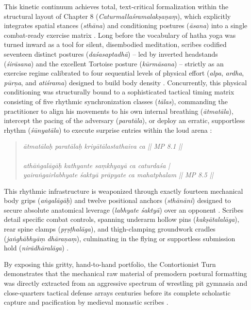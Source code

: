 \documentclass[11pt,twoside,letterpaper]{article}
\begin{document}
This kinetic continuum achieves total, text-critical formalization within the structural layout of Chapter 8 (\textit{Caturmallaśramalakṣaṇaṃ}), which explicitly integrates spatial stances (\textit{sthāna}) and conditioning postures (\textit{āsana}) into a single combat-ready exercise matrix \citep{MP_7}. Long before the vocabulary of hatha yoga was turned inward as a tool for silent, disembodied meditation, scribes codified seventeen distinct postures (\textit{daśasaptadhā}) -- led by inverted headstands (\textit{śirāsana}) and the excellent Tortoise posture (\textit{kūrmāsana}) -- strictly as an exercise regime calibrated to four sequential levels of physical effort (\textit{alpa}, \textit{ardha}, \textit{pūrṇa}, and \textit{atiśrama}) designed to build body density \citep{MP_7}. Concurrently, this physical conditioning was structurally bound to a sophisticated tactical timing matrix consisting of five rhythmic synchronization classes (\textit{tālas}), commanding the practitioner to align his movements to his own internal breathing (\textit{ātmatāla}), intercept the pacing of the adversary (\textit{paratāla}), or deploy an erratic, supportless rhythm (\textit{śūnyatāla}) to execute surprise entries within the loud arena \citep{MP_7}:

\begin{quote}
\small
\textit{ātmatālaḥ paratālaḥ kriyātālastathaiva ca || MP 8.1 || \\
\\
athāṅgalāgāḥ kathyante saṃkhyayā ca caturdaśa | \\
yairaṅgairlabhyate śaktyā prāpyate ca mahatphalam || MP 8.5 ||}
\end{quote}

This rhythmic infrastructure is weaponized through exactly fourteen mechanical body grips (\textit{aṅgalāgāḥ}) and twelve positional anchors (\textit{sthānāni}) designed to secure absolute anatomical leverage (\textit{labhyate śaktyā}) over an opponent \citep{MP_7}. Scribes detail specific combat controls, spanning underarm hollow pins (\textit{kakṣātalalāga}), rear spine clamps (\textit{pṛṣṭhalāga}), and thigh-clamping groundwork cradles (\textit{jaṅghābhyāṃ dhāraṇaṃ}), culminating in the flying or supportless submission hold (\textit{nirādhāralāga}) \citep{MP_7}. 

By exposing this gritty, hand-to-hand portfolio, the Contortionist Turn demonstrates that the mechanical raw material of premodern postural formatting was directly extracted from an aggressive spectrum of wrestling pit gymnasia and close-quarters tactical defense arrays centuries before its complete scholastic capture and pacification by medieval monastic scribes \citep{MP_7, Wujastyk2025}.
\end{document}
